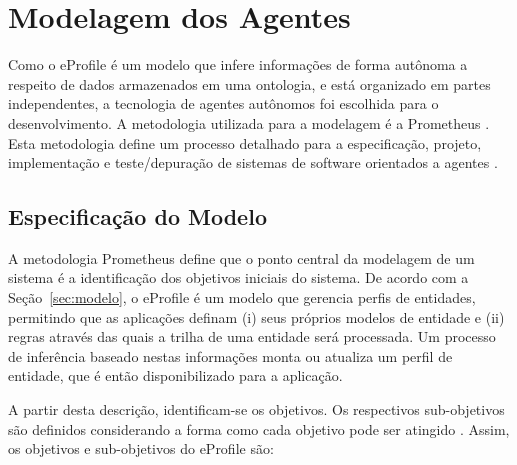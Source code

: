 \section{Modelagem dos Agentes}
\label{sec:modelagem}


Como o eProfile é um modelo que infere informações de forma autônoma a respeito de dados armazenados em uma ontologia, e está organizado em partes independentes, a tecnologia de agentes autônomos foi escolhida para o desenvolvimento. A metodologia utilizada para a modelagem é a Prometheus \cite{prometheus}. Esta metodologia define um processo detalhado para a especificação, projeto, implementação e teste/depuração de sistemas de software orientados a agentes \cite{prometheus-book}.


\subsection{Especificação do Modelo}
\label{sec:especificacao}


A metodologia Prometheus define que o ponto central da modelagem de um sistema é a identificação dos objetivos iniciais do sistema. De acordo com a Seção~\ref{sec:modelo}, o eProfile é um modelo que gerencia perfis de entidades, permitindo que as aplicações definam (i) seus próprios modelos de entidade e (ii) regras através das quais a trilha de uma entidade será processada. Um processo de inferência baseado nestas informações monta ou atualiza um perfil de entidade, que é então disponibilizado para a aplicação.

A partir desta descrição, identificam-se os objetivos. Os respectivos sub-objetivos são definidos considerando a forma como cada objetivo pode ser atingido \cite{prometheus-book}. Assim, os objetivos e sub-objetivos do eProfile são:

